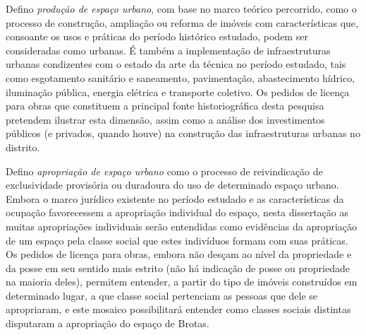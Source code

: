 Defino \textit{produção de espaço urbano}, com base no marco teórico percorrido, como o processo de construção, ampliação ou reforma de imóveis com características que, consoante os usos e práticas do período histórico estudado, podem ser consideradas como urbanas. É também a implementação de infraestruturas urbanas condizentes com o estado da arte da técnica no período estudado, tais como esgotamento sanitário e saneamento, pavimentação, abastecimento hídrico, iluminação pública, energia elétrica e transporte coletivo. Os pedidos de licença para obras que constituem a principal fonte historiográfica desta pesquisa pretendem ilustrar esta dimensão, assim como a análise dos investimentos públicos (e privados, quando houve) na construção das infraestruturas urbanas no distrito.

Defino \textit{apropriação de espaço urbano} como o processo de reivindicação de exclusividade provisória ou duradoura do uso de determinado espaço urbano. Embora o marco jurídico existente no período estudado e as características da ocupação favorecessem a apropriação individual do espaço, nesta dissertação as muitas apropriações individuais serão entendidas como evidências da apropriação de um espaço pela classe social que estes indivíduos formam com suas práticas. Os pedidos de licença para obras, embora não desçam ao nível da propriedade e da posse em seu sentido mais estrito (não há indicação de posse ou propriedade na maioria deles), permitem entender, a partir do tipo de imóveis construídos em determinado lugar, a que classe social pertenciam as pessoas que dele se apropriaram, e este mosaico possibilitará entender como classes sociais distintas disputaram a apropriação do espaço de Brotas.

